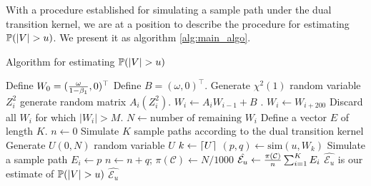 With a procedure established for simulating a sample path under the
dual transition kernel, we are at a position to describe the procedure
for estimating $\P(|V| > u)$. We present it as algorithm
\ref{alg:main_algo}.
\begin{algorithm}[htb!]
  \caption{Algorithm for estimating $\P(|V| > u)$}
  \label{alg:main_algo}
  \begin{algorithmic}
    \State Define $W_0 = ({\omega \over 1 - \beta_1}, 0)^\top$
    \State Define $B = (\omega, 0)^\top$.
    \State Generate $\chi^2(1)$ random variable $Z_i^2$ 
    \State generate random matrix $A_i(Z_i^2)$.
    \State $W_i \gets A_i W_{i-1} + B$
    \EndFor
    .
    \State $W_i \gets W_{i + 200}$
    \EndFor
    \State Discard all $W_ i$ for which $|W_i| > M$.
    \State $N \gets \text{number of remaining } W_i$
    \State Define a vector $E$ of length $K$.
    \State $n \gets 0$
    \Comment Simulate $K$ sample paths according to the dual
    transition kernel
    \State Generate $U(0, N)$ random variable $U$
    \State $k \gets \ceil{U}$
    \State $(p, q) \gets \text{sim}(u, W_k)$
    \Comment Simulate a sample path
    \State $E_i \gets p$
    \State $n \gets n + q$;
    \EndFor
    \State $\pi(\mathcal C) \gets N/1000$
    \State $\hat{\mathcal E_u} \gets {\pi(\mathcal C) \over n} \sum_{i=1}^K E_i$
    \Comment $\hat{\mathcal E_u}$ is our estimate of $\P(|V| > u)$
    \State \Return $\hat{\mathcal E_u}$
    \EndProcedure
  \end{algorithmic}
\end{algorithm}

